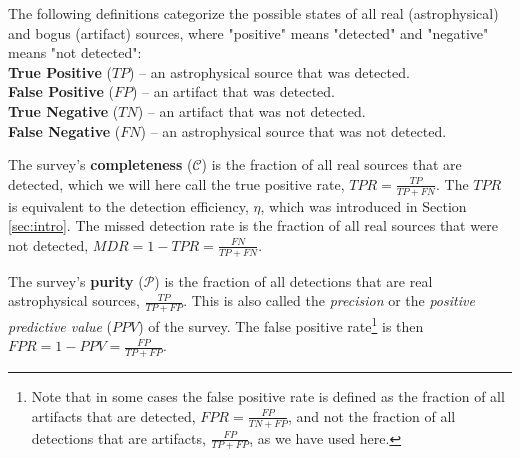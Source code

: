 \documentclass[DM,lsstdraft,toc]{lsstdoc}
\begin{document}
The following definitions categorize the possible states of all real (astrophysical) and bogus (artifact) sources, where "positive" means "detected" and "negative" means "not detected": \\
\hspace*{10mm} {\bf True Positive} ($\mathit{TP}$) -- an astrophysical source that was detected. \\
\hspace*{10mm} {\bf False Positive} ($\mathit{FP}$) -- an artifact that was detected. \\
\hspace*{10mm} {\bf True Negative} ($\mathit{TN}$) -- an artifact that was not detected. \\
\hspace*{10mm} {\bf False Negative} ($\mathit{FN}$) -- an astrophysical source that was not detected. 

The survey's {\bf completeness} ($\mathcal{C}$) is the fraction of all real sources that are detected, which we will here call the true positive rate, $\mathit{TPR} = \frac{\mathit{TP}}{\mathit{TP}+\mathit{FN}}$. The $\mathit{TPR}$ is equivalent to the detection efficiency, $\eta$, which was introduced in Section \ref{sec:intro}. The missed detection rate is the fraction of all real sources that were not detected, $\mathit{MDR} = 1 - \mathit{TPR} = \frac{\mathit{FN}}{\mathit{TP}+\mathit{FN}}$. 

The survey's {\bf purity} ($\mathcal{P}$) is the fraction of all detections that are real astrophysical sources, $\frac{\mathit{TP}}{\mathit{TP}+\mathit{FP}}$. This is also called the {\it precision} or the {\it positive predictive value} ($\mathit{PPV}$) of the survey. The false positive rate\footnote{Note that in some cases the false positive rate is defined as the fraction of all artifacts that are detected, $\mathit{FPR} = \frac{\mathit{FP}}{\mathit{TN}+\mathit{FP}}$, and not the fraction of all detections that are artifacts, $\frac{\mathit{FP}}{\mathit{TP}+\mathit{FP}}$, as we have used here.} is then $\mathit{FPR} = 1 - \mathit{PPV} = \frac{\mathit{FP}}{\mathit{TP}+\mathit{FP}}$. 
\end{document}
